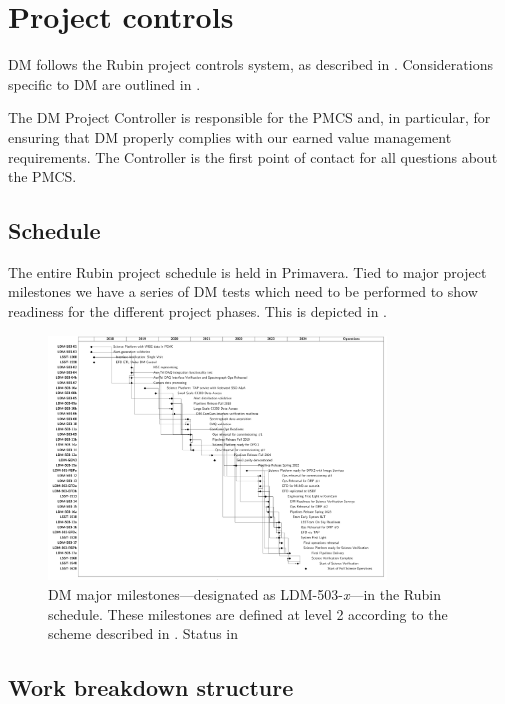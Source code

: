 \newpage
\section{Project controls}\label{sect:dmpc}

DM follows the Rubin project controls system, as described in .
Considerations specific to DM are outlined in .

The DM Project Controller is responsible for the PMCS and, in particular, for ensuring that DM properly complies with our earned value management requirements.
The Controller is the first point of contact for all questions about the PMCS.

\subsection{Schedule}\label{sect:schedule}

The entire Rubin project schedule is held in Primavera.
Tied to major project milestones we have a series of DM tests which need to be performed to show readiness for the different project phases.
This is depicted in .

\begin{figure}[htbp]
	\begin{center}
		 \includegraphics[width=0.8\textwidth]{gantt}
		 \caption{DM major milestones---designated as LDM-503-\textit{x}---in
         the Rubin schedule. These milestones are defined at level 2 according
         to the scheme described in . Status in }
         \label{fig:schedule}
	 \end{center}
 \end{figure}

\subsection{Work breakdown structure}\label{sect:WBS}

